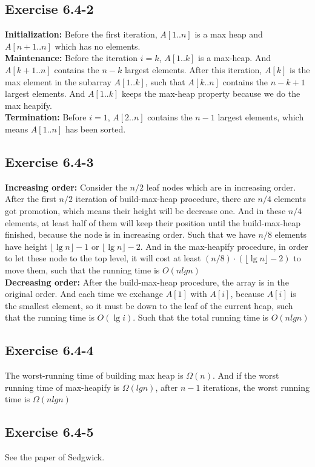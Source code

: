 \documentclass[12pt]{article}
\theoremstyle{definition}
\theoremstyle{remark}
\begin{document}
\subsection*{Exercise 6.4-2}
\textbf{Initialization:} Before the first iteration, $A[1..n]$ is a max heap and $A[n+1..n]$ which has no elements.\\
\textbf{Maintenance:} Before the iteration $i=k$, $A[1..k]$ is a max-heap. And $A[k+1..n]$ contains the $n-k$ largest elements. After this iteration, $A[k]$ is the max element in the subarray $A[1..k]$, such that $A[k..n]$ contains the $n-k+1$ largest elements. And $A[1..k]$ keeps the max-heap property because we do the max heapify.\\
\textbf{Termination:} Before $i=1$, $A[2..n]$ contains the $n-1$ largest elements, which means $A[1..n]$ has been sorted.
\subsection*{Exercise 6.4-3}
\textbf{Increasing order:} Consider the $n/2$ leaf nodes which are in increasing order. After the first $n/2$ iteration of build-max-heap procedure, there are $n/4$ elements got promotion, which means their height will be decrease one. And in these $n/4$ elements, at least half of them will keep their position until the build-max-heap finished, because the node is in increasing order. Such that we have $n/8$ elements have height $\lfloor\lg{n}\rfloor-1$ or $\lfloor\lg{n}\rfloor-2$. And in the max-heapify procedure, in order to let these node to the top level, it will cost at least $(n/8)\cdot (\lfloor\lg{n}\rfloor-2)$ to move them, such that the running time is $O(nlgn)$\\
\textbf{Decreasing order:} After the build-max-heap procedure, the array is in the original order. And each time we exchange $A[1]$ with $A[i]$, because $A[i]$ is the smallest element, so it must be down to the leaf of the current heap, such that the running time is $O(\lg{i})$. Such that the total running time is $O(nlgn)$
\subsection*{Exercise 6.4-4}
The worst-running time of building max heap is $\Omega(n)$. And if the worst running time of max-heapify is $\Omega(lgn)$, after $n-1$ iterations, the worst running time is $\Omega(nlgn)$
\subsection*{Exercise 6.4-5}
See the paper of Sedgwick.
\end{document}
